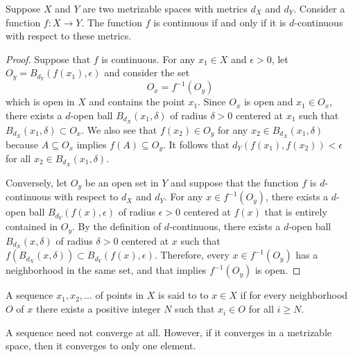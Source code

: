 \begin{theorem}
Suppose $X$ and $Y$ are two metrizable spaces with metrics $d_X$ and $d_Y$.
Consider a function $f  \colon X \rightarrow Y$.
The function $f$ is continuous if and only if it is $d$-continuous with respect to these metrics.
\end{theorem}
\begin{proof}
Suppose that $f$ is continuous.
For any $x_1 \in X$ and $\epsilon > 0$, let $O_y =  B_{d_Y} (f(x_1), \epsilon)$ and consider the set
\begin{equation*}
O_x = f^{-1} \left( O_y \right)
\end{equation*}
which is open in $X$ and contains the point $x_1$.
Since $O_x$ is open and $x_1 \in O_x$, there exists a $d$-open ball $B_{d_X} (x_1, \delta)$ of radius $\delta>0$ centered at $x_1$ such that $B_{d_X} (x_1, \delta) \subset O_x$.
We also see that $f(x_2) \in O_y$ for any $x_2 \in B_{d_X} (x_1, \delta)$ because $A \subseteq O_x$ implies $f(A) \subseteq O_y$.
It follows that $d_Y \left( f(x_1), f(x_2) \right) < \epsilon$ for all $x_2 \in B_{d_X} (x_1, \delta)$.

Conversely, let $O_y$ be an open set in $Y$ and suppose that the function $f$ is $d$-continuous with respect to $d_X$ and $d_Y$.
For any $x \in f^{-1} (O_y)$, there exists a $d$-open ball $B_{d_Y} (f(x), \epsilon)$ of radius $\epsilon>0$ centered at $f(x)$ that is entirely contained in $O_y$.
By the definition of $d$-continuous, there exists a $d$-open ball $B_{d_X} (x, \delta)$ of radius $\delta>0$ centered at $x$ such that $f \left( B_{d_X} (x,\delta) \right) \subset B_{d_Y} \left( f(x), \epsilon \right)$.
Therefore, every $x \in f^{-1}(O_y)$ has a neighborhood in the same set, and that implies $f^{-1} (O_y)$ is open.
\end{proof}

\begin{definition} \label{definition:SequenceConvergence}
A sequence $x_1, x_2, \ldots$ of points in $X$ is said to  to $x \in X$ if for every neighborhood $O$ of $x$ there exists a positive integer $N$ such that $x_i \in O$ for all $i \geq N$.
\end{definition}

A sequence need not converge at all.
However, if it converges in a metrizable space, then it converges to only one element.

